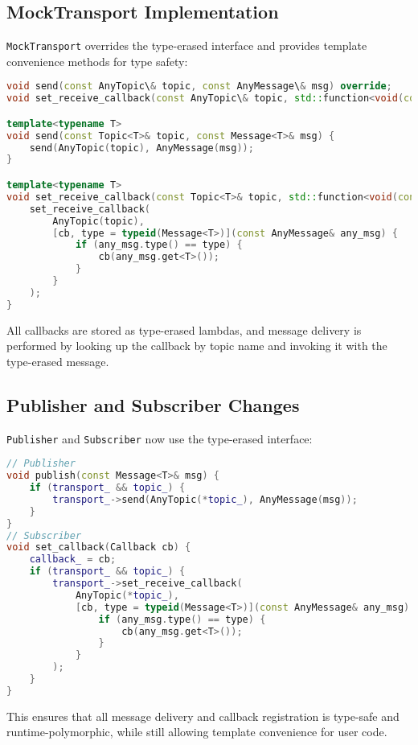 \documentclass[12pt]{report}
\begin{document}
\subsection{MockTransport Implementation}
\texttt{MockTransport} overrides the type-erased interface and provides template convenience methods for type safety:
\begin{lstlisting}[language=C++]
void send(const AnyTopic\& topic, const AnyMessage\& msg) override;
void set_receive_callback(const AnyTopic\& topic, std::function<void(const AnyMessage\&)>&& cb) override;

template<typename T>
void send(const Topic<T>& topic, const Message<T>& msg) {
    send(AnyTopic(topic), AnyMessage(msg));
}

template<typename T>
void set_receive_callback(const Topic<T>& topic, std::function<void(const Message<T>&)> cb) {
    set_receive_callback(
        AnyTopic(topic),
        [cb, type = typeid(Message<T>)](const AnyMessage& any_msg) {
            if (any_msg.type() == type) {
                cb(any_msg.get<T>());
            }
        }
    );
}
\end{lstlisting}
All callbacks are stored as type-erased lambdas, and message delivery is performed by looking up the callback by topic name and invoking it with the type-erased message.

\subsection{Publisher and Subscriber Changes}
\texttt{Publisher} and \texttt{Subscriber} now use the type-erased interface:
\begin{lstlisting}[language=C++]
// Publisher
void publish(const Message<T>& msg) {
    if (transport_ && topic_) {
        transport_->send(AnyTopic(*topic_), AnyMessage(msg));
    }
}
// Subscriber
void set_callback(Callback cb) {
    callback_ = cb;
    if (transport_ && topic_) {
        transport_->set_receive_callback(
            AnyTopic(*topic_),
            [cb, type = typeid(Message<T>)](const AnyMessage& any_msg) {
                if (any_msg.type() == type) {
                    cb(any_msg.get<T>());
                }
            }
        );
    }
}
\end{lstlisting}
This ensures that all message delivery and callback registration is type-safe and runtime-polymorphic, while still allowing template convenience for user code.
\end{document}
